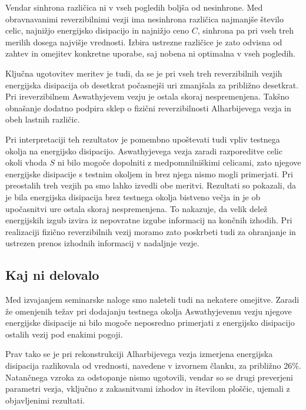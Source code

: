 \documentclass[graybox, envcountchap]{svmult}
\begin{document}
Vendar sinhrona različica ni v vseh pogledih boljša od nesinhrone. Med obravnavanimi reverzibilnimi vezji ima nesinhrona različica najmanjše število celic, najnižjo energijsko disipacijo in najnižjo ceno $C$, sinhrona pa pri vseh treh merilih dosega najvišje vrednosti. Izbira ustrezne različice je zato odvisna od zahtev in omejitev konkretne uporabe, saj nobena ni optimalna v vseh pogledih.

Ključna ugotovitev meritev je tudi, da se je pri vseh treh reverzibilnih vezjih energijska disipacija ob desetkrat počasnejši uri zmanjšala za približno desetkrat. Pri ireverzibilnem Aswathyjevem vezju \cite{aswathy2024} je ostala skoraj nespremenjena. Takšno obnašanje dodatno podpira sklep o fizični reverzibilnosti Alharbijevega vezja \cite{alharbi2022} in obeh lastnih različic.

Pri interpretaciji teh rezultatov je pomembno upoštevati tudi vpliv testnega okolja na energijsko disipacijo. Aswathyjevega vezja \cite{aswathy2024} zaradi razporeditve celic okoli vhoda $S$ ni bilo mogoče dopolniti z medpomnilniškimi celicami, zato njegove energijske disipacije s testnim okoljem in brez njega nismo mogli primerjati. Pri preostalih treh vezjih pa smo lahko izvedli obe meritvi. Rezultati so pokazali, da je bila energijska disipacija brez testnega okolja bistveno večja in je ob upočasnitvi ure ostala skoraj nespremenjena. To nakazuje, da velik delež energijskih izgub izvira iz nepovratne izgube informacij na končnih izhodih. Pri realizaciji fizično reverzibilnih vezij moramo zato poskrbeti tudi za ohranjanje in ustrezen prenos izhodnih informacij v nadaljnje vezje.

\subsection{Kaj ni delovalo}
\label{g21:sec:neuspehi}

Med izvajanjem seminarske naloge smo naleteli tudi na nekatere omejitve. Zaradi že omenjenih težav pri dodajanju testnega okolja Aswathyjevemu vezju \cite{aswathy2024} njegove energijske disipacije ni bilo mogoče neposredno primerjati z energijsko disipacijo ostalih vezij pod enakimi pogoji. 

Prav tako se je pri rekonstrukciji Alharbijevega vezja \cite{alharbi2022} izmerjena energijska disipacija razlikovala od vrednosti, navedene v izvornem članku, za približno 26\%. Natančnega vzroka za odstopanje nismo ugotovili, vendar so se drugi preverjeni parametri vezja, vključno z zakasnitvami izhodov in številom ploščic, ujemali z objavljenimi rezultati.
\end{document}
